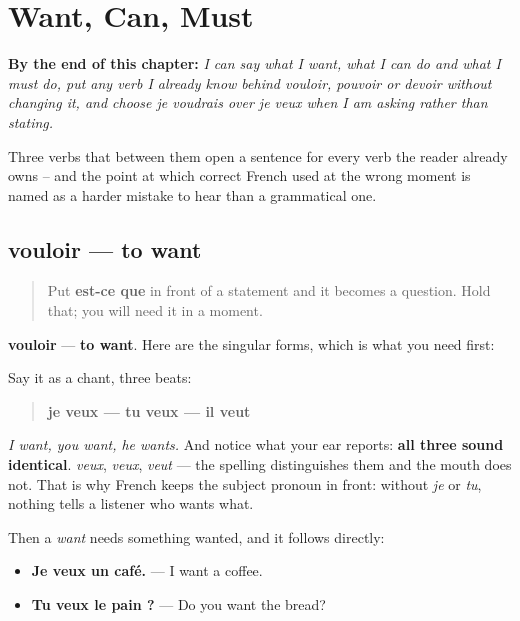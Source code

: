 
\chapter{Want, Can, Must}
\label{ch:fr-modaux}

\begin{chapteropening}
\textbf{By the end of this chapter:} \emph{I can say what I want, what I can do and what I must do, put any verb I already know behind vouloir, pouvoir or devoir without changing it, and choose je voudrais over je veux when I am asking rather than stating.}

Three verbs that between them open a sentence for every verb the reader already owns -- and the point at which correct French used at the wrong moment is named as a harder mistake to hear than a grammatical one.
\end{chapteropening}

\section[vouloir]{vouloir — to want}

\label{lesson:FR-C33-vouloir}



\begin{quote}
Put \textbf{est-ce que} in front of a statement and it becomes a question. Hold that; you will need it in a moment.
\end{quote}

\begin{cousinweb}
\textbf{vouloir} — \textbf{to want}. Here are the singular forms, which is what you need first:

Say it as a chant, three beats:

\begin{quote}
\textbf{je veux — tu veux — il veut}
\end{quote}

\emph{I want, you want, he wants.} And notice what your ear reports: \textbf{all three sound identical}. \emph{veux}, \emph{veux}, \emph{veut} — the spelling distinguishes them and the mouth does not. That is why French keeps the subject pronoun in front: without \emph{je} or \emph{tu}, nothing tells a listener who wants what.

Then a \emph{want} needs something wanted, and it follows directly:

\begin{itemize}
\raggedright
  \item \textbf{Je veux un café.} — I want a coffee.
  \item \textbf{Tu veux le pain ?} — Do you want the bread?
\end{itemize}
\end{cousinweb}

